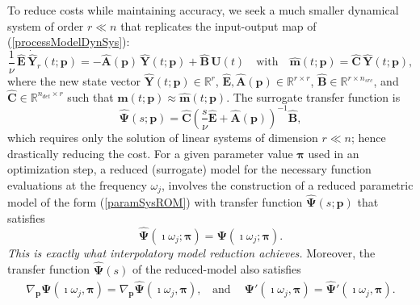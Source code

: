 \documentclass{report}
\begin{document}
To reduce costs while maintaining accuracy, we seek a much smaller
dynamical system of order $r \ll n$
that replicates the input-output map of (\ref{processModelDynSys}):
\begin{equation} \label{paramSysROM}
\frac{1}{\nu}\,\widehat{ \mathbf{E}}\, \dot{\widehat{ \mathbf{Y}}}_r(t; \mathbf{p}) =
- \widehat{ \mathbf{A}}( \mathbf{p})\, \widehat{ \mathbf{Y}}(t; \mathbf{p})
+ \widehat{ \mathbf{B}}\, \mathbf{U}(t) \quad\mbox{with}\quad
\widehat{\boldsymbol{m}}(t; \mathbf{p}) = \widehat{ \mathbf{C}}\,
\widehat{ \mathbf{Y}}(t; \mathbf{p}) ,
\end{equation}
where the new state vector $\widehat{ \mathbf{Y}}(t; \mathbf{p})\in \mathbb{R}^r$,
$\widehat{ \mathbf{E}},\widehat{ \mathbf{A}}( \mathbf{p}) \in \mathbb{R}^{r \times r}$,
$\widehat{ \mathbf{B}} \in \mathbb{R}^{r \times n_{src}}$, and
$ \widehat{ \mathbf{C}}\in \mathbb{R}^{n_{det}\times r}$
such that ${\boldsymbol{m}}(t; \mathbf{p}) \approx
\widehat{\boldsymbol{m}}(t; \mathbf{p}) $.
The surrogate transfer function is
$$
\widehat{ \boldsymbol{\Psi}}(s; \mathbf{p}) =
\widehat{ \mathbf{C}} \left(\frac{s}{\nu}
\widehat{ \mathbf{E}} + \widehat{ \mathbf{A}}( \mathbf{p})\right)^{-1}
\widehat{ \mathbf{B}},
$$
which requires only the solution of linear systems
of dimension $r \ll n$; hence drastically reducing the cost.
For a given parameter value $\boldsymbol{\pi}$ used in an optimization step,
a reduced (surrogate) model for the necessary function evaluations
at the frequency $\omega_j$, involves the construction of a reduced parametric model
of the form (\ref{paramSysROM})
with transfer function $\widehat{ \boldsymbol{\Psi}}(s; \mathbf{p})$ that satisfies
\begin{equation} \label{eq:hermite}
\widehat{ \boldsymbol{\Psi}}\left(\imath \omega_j;\boldsymbol{\pi}\right) =
\boldsymbol{\Psi}\left(\imath \omega_j;\boldsymbol{\pi}\right) .
\end{equation}
{\it This is exactly what interpolatory model reduction achieves.}
Moreover, the transfer function $\widehat{ \boldsymbol{\Psi}}(s)$ of the
reduced-model also satisfies
\begin{eqnarray}
\nabla_{ \mathbf{p}} \boldsymbol{\Psi}\left(\imath \omega_j,\boldsymbol{\pi}\right) =
\nabla_{ \mathbf{p}}\widehat{ \boldsymbol{\Psi}}\left(\imath
\omega_j,\boldsymbol{\pi}\right),
~~~~ \mbox{and } ~~~~ \boldsymbol{\Psi}'\left(\imath \omega_j,\boldsymbol{\pi}\right) =
\widehat{ \boldsymbol{\Psi}}'\left(\imath \omega_j,\boldsymbol{\pi}\right). \nonumber
\end{eqnarray}
\end{document}
